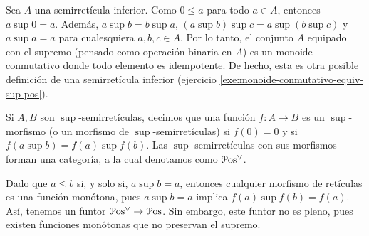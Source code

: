 Sea $A$ una semirretícula inferior.
Como $0\leq a$ para todo $a\in A$, entonces $a\sup 0=a$.
Además, $a\sup b=b\sup a$, $(a\sup b)\sup c=a\sup(b\sup c)$
y $a\sup a=a$ para cualesquiera $a,b,c\in A$.
Por lo tanto, el conjunto $A$ equipado con el supremo (pensado
como operación binaria en $A$) es un monoide
conmutativo donde todo elemento es idempotente.
De hecho, esta es otra posible definición de una semirretícula
inferior (ejercicio \ref{exe:monoide-conmutativo-equiv-sup-pos}).
\iffalse
Recíprocamente, si $(A,\sup,0)$ es un monoide conmutativo
en el cual todo elemento es idempotente,
entonces la relación definida como
\[
  a\leq b \ssi a\sup b=b
\]
es un orden parcial en $A$ tal que el supremo es $\sup$.
\begin{proof}
    En efecto, esto es un orden parcial:
    \begin{itemize}
        \item (Refl). Como $a$ es idempotente, tenemos $a\sup a=a$.
        Luego, $a\leq a$.
        \item (Antisim). Supongamos que $a\leq b$ y $b\leq a$.
        Es decir, $a\sup b=b$ y $b\sup a=a$.
        Como $\sup$ es conmutativo, tenemos
        \[
            b = a\sup b = b\sup a = a
        .\]
        \item (Trans). Supongamos que $a\leq b$ y que $b\leq c$.
        Es decir, $a\sup b = b$ y $b\sup c = c$.
        Como $\sup$ es asociativo, tenemos
        \[
            a\sup c = a\sup(b\sup c) = (a\sup b)\sup c = b\sup c = c
        .\]
        Esto es, $a\leq c$.
    \end{itemize}
    Ahora mostraremos que $\sup$ es el supremo de este orden.
    Por inducción, basta mostrarlo en el vacío y en
    pares de elementos.
    Como $0\sup a=a$, entonces $0\leq a$ para todo $a\in A$.
    Ahora sean $a,b\in A$, y supongamos que $c\in A$ es tal que
    $a,b\leq c$.
    Esto es, $a\sup c = c$ y $b\sup c = c$.
    Luego,
    \[
        (a\sup b)\sup c = (a\sup c)\sup(b\sup c) = c\sup c = c
    .\]
    Por lo tanto, $a\sup b\leq c$.
\end{proof}
\fi

Si $A,B$ son $\sup$-semirretículas,
decimos que una función $f:A\to B$ es
un $\sup$-morfismo (o un morfismo de $\sup$-semirretículas)
si $f(0)=0$ y si $f(a\sup b)=f(a)\sup f(b)$.
Las $\sup$-semirretículas con sus morfismos forman una
categoría, a la cual denotamos como $\mathcal{P}\mathrm{os}^\vee$.

Dado que $a\leq b$ si, y solo si, $a\sup b=a$, entonces
cualquier morfismo de retículas es una función monótona,
pues $a\sup b=a$ implica $f(a)\sup f(b)=f(a)$.
Así, tenemos un funtor $\mathcal{P}\mathrm{os}^\vee\to\mathcal{P}\mathrm{os}$. Sin embargo, este
funtor no es pleno, pues existen funciones monótonas que no
preservan el supremo.

